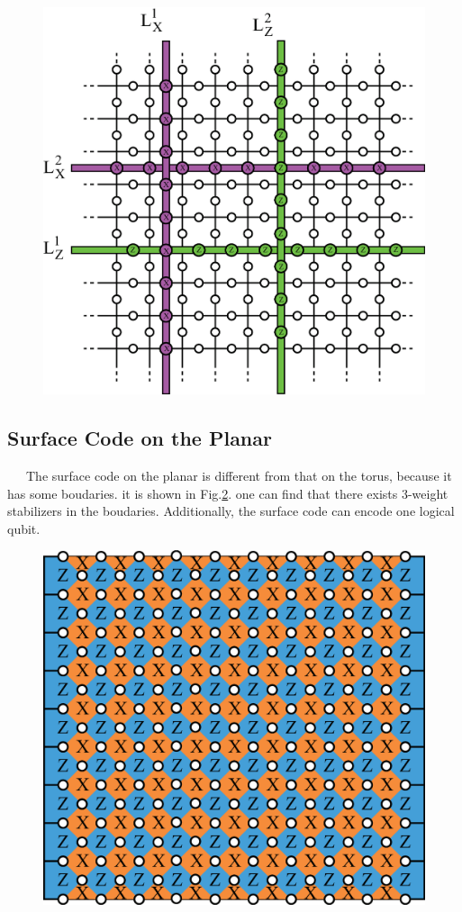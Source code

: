 \documentclass[a4paper,11pt]{ltjsarticle}
\begin{document}
{{    \begin{figure}[h]
        \centering
        \includegraphics[scale=0.40]{figure/logical_operator.eps}
        \vspace{0pt}\caption{}
        \label{logical_operator}
        \vspace{-10pt}
    \end{figure}
    }


    \subsection{Surface Code on the Planar}{
        \ \ \ The surface code on the planar is different from that on the torus, because it has some boudaries. it is shown in Fig.\ref{planar}. one can find that there exists 3-weight stabilizers in the boudaries. Additionally, the surface code can encode one logical qubit.

        \begin{figure}[h]
            \centering
            \includegraphics[scale=0.40]{figure/planar.eps}
            \vspace{0pt}\caption{}
            \label{planar}
            \vspace{-10pt}
        \end{figure}
    }
}
\end{document}
